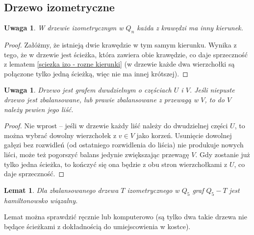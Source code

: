 \documentclass{pracamgr}
\newtheorem{lemma}[theorem]{Lemat}
\newtheorem{remark}[theorem]{Uwaga}
\begin{document}
   \subsection{Drzewo izometryczne}
    \begin{remark}\label{drzewo izo - kierunek tylko raz}
     W drzewie izometrycznym w $Q_n$ każda z krawędzi ma inny kierunek.
    \end{remark}
    \begin{proof}
     Załóżmy, że istnieją dwie krawędzie w tym samym kierunku. Wynika z tego, że w drzewie jest ścieżka,
     która zawiera obie krawędzie, co daje sprzeczność z lematem
     \ref{sciezka izo - rozne kierunki} (w drzewie każde dwa wierzchołki są połączone tylko jedną ścieżką, więc nie ma innej krótszej).
    \end{proof}
    \begin{remark}\label{drzewo izo zbal - ma liść z V}
     Drzewo jest grafem dwudzielnym o częściach $U$ i $V$. Jeśli niepuste drzewo jest zbalansowane, lub prawie zbalansowane z przewagą w $V$,
     to do $V$ należy pewien jego liść.
    \end{remark}
    \begin{proof}
     Nie wprost -- jeśli w drzewie każdy liść należy do dwudzielnej części $U$, to można wybrać dowolny wierzchołek z $v\in V$ jako korzeń.
     Usunięcie dowolnej gałęzi bez rozwidleń (od ostatniego rozwidlenia do liścia) nie produkuje nowych liści, może też pogorszyć balans jedynie
     zwiększając przewagę $V$. Gdy zostanie już tylko jedna ścieżka, to kończyć się ona będzie z obu stron wierzchołkami z $U$, co daje sprzeczność.
    \end{proof}
    \begin{lemma}\label{Q_5-izo tree hamilton}
     Dla zbalansowanego drzewa $T$ izometrycznego w $Q_5$ graf $Q_5-T$ jest hamiltonowsko wiązalny.
    \end{lemma}
    Lemat można sprawdzić ręcznie lub komputerowo (są tylko dwa takie drzewa nie będące ścieżkami z dokładnością do umiejscowienia w kostce).
\end{document}
